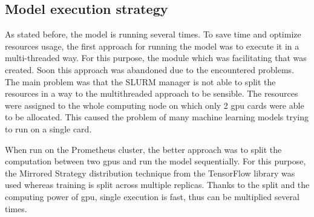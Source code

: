 \subsection{Model execution strategy}\label{subsec:model-execution-strategy}
As stated before, the model is running several times.
To save time and optimize resources usage, the first approach for running the model was to execute it in a multi-threaded way.
For this purpose, the module which was facilitating that was created.
Soon this approach was abandoned due to the encountered problems.
The main problem was that the SLURM manager is not able to split the resources in a way to the multithreaded approach to be sensible.
The resources were assigned to the whole computing node on which only 2 \gls{gpu} cards were able to be allocated.
This caused the problem of many machine learning models trying to run on a single card.

When run on the Prometheus cluster, the better approach was to split the computation between two \gls{gpu}s and run the model sequentially.
For this purpose, the Mirrored Strategy distribution technique from the TensorFlow library was used whereas training is split across multiple replicas.
Thanks to the split and the computing power of \gls{gpu}, single execution is fast, thus can be multiplied several times.
